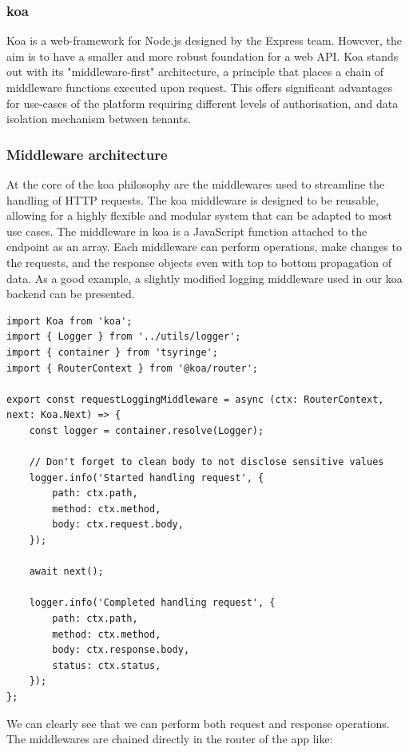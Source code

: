 \subsubsection{\gls{koa}}
Koa \cite{koajs-docs} is a web-framework for Node.js designed by the Express team.
However, the aim is to have a smaller and more robust foundation for a web API.
Koa stands out with its "middleware-first" architecture, a principle that places a chain of middleware functions executed upon request.
This offers significant advantages for use-cases of the platform requiring different levels of authorisation, and data isolation mechanism between tenants.

\subsubsection{Middleware architecture}
At the core of the \gls{koa} philosophy are the middlewares used to streamline the handling of HTTP requests.
The \gls{koa} middleware is designed to be reusable, allowing for a highly flexible and modular system that can be adapted to most use cases.
The middleware in \gls{koa} is a JavaScript function attached to the endpoint as an array.
Each middleware can perform operations, make changes to the requests, and the response objects even with top to bottom propagation of data.
As a good example, a slightly modified logging middleware used in our \gls{koa} backend can be presented.

\medskip
\begin{lstlisting}[caption=Koa logging middleware]
import Koa from 'koa';
import { Logger } from '../utils/logger';
import { container } from 'tsyringe';
import { RouterContext } from '@koa/router';

export const requestLoggingMiddleware = async (ctx: RouterContext, next: Koa.Next) => {
	const logger = container.resolve(Logger);

	// Don't forget to clean body to not disclose sensitive values
	logger.info('Started handling request', {
		path: ctx.path,
		method: ctx.method,
		body: ctx.request.body,
	});

	await next();

	logger.info('Completed handling request', {
		path: ctx.path,
		method: ctx.method,
		body: ctx.response.body,
		status: ctx.status,
	});
};
\end{lstlisting}

We can clearly see that we can perform both request and response operations. The middlewares are chained directly in the router of the app like:

